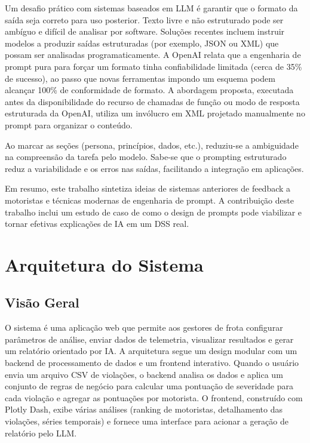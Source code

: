 \documentclass[12pt]{article}
\begin{document}
Um desafio prático com sistemas baseados em LLM é garantir que o formato da saída seja correto para uso posterior. Texto livre e não estruturado pode ser ambíguo e difícil de analisar por software. Soluções recentes incluem instruir modelos a produzir saídas estruturadas (por exemplo, JSON ou XML) que possam ser analisadas programaticamente. A OpenAI relata que a engenharia de prompt pura para forçar um formato tinha confiabilidade limitada (cerca de 35\% de sucesso), ao passo que novas ferramentas impondo um esquema podem alcançar 100\% de conformidade de formato. A abordagem proposta, executada antes da disponibilidade do recurso de chamadas de função ou modo de resposta estruturada da OpenAI, utiliza um invólucro em XML projetado manualmente no prompt para organizar o conteúdo.

Ao marcar as seções (persona, princípios, dados, etc.), reduziu-se a ambiguidade na compreensão da tarefa pelo modelo. Sabe-se que o prompting estruturado reduz a variabilidade e os erros nas saídas, facilitando a integração em aplicações. 

Em resumo, este trabalho sintetiza ideias de sistemas anteriores de feedback a motoristas e técnicas modernas de engenharia de prompt. A contribuição deste trabalho inclui um estudo de caso de como o design de prompts pode viabilizar e tornar efetivas explicações de IA em um DSS real.
 
\section{Arquitetura do Sistema}

\subsection{Visão Geral}

O sistema é uma aplicação web que permite aos gestores de frota configurar parâmetros de análise, enviar dados de telemetria, visualizar resultados e gerar um relatório orientado por IA. A arquitetura segue um design modular com um backend de processamento de dados e um frontend interativo. Quando o usuário envia um arquivo CSV de violações, o backend analisa os dados e aplica um conjunto de regras de negócio para calcular uma pontuação de severidade para cada violação e agregar as pontuações por motorista. O frontend, construído com Plotly Dash, exibe várias análises (ranking de motoristas, detalhamento das violações, séries temporais) e fornece uma interface para acionar a geração de relatório pelo LLM. 
\end{document}
